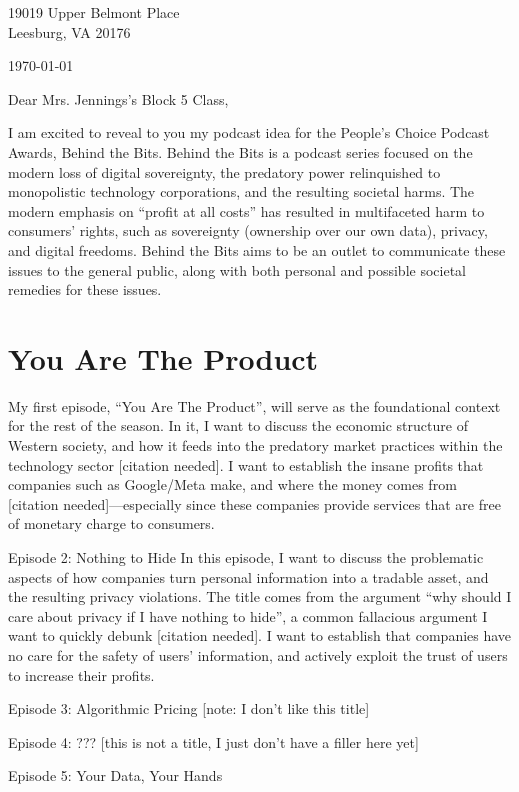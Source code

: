 \documentclass[12pt]{article}
\begin{document}
\begin{flushright}
  19019 Upper Belmont Place \\ Leesburg, VA 20176
  
  \medskip \today
\end{flushright}

\medskip
Dear Mrs. Jennings’s Block 5 Class,

\medskip
I am excited to reveal to you my podcast idea for the People’s Choice Podcast
Awards, Behind the Bits. Behind the Bits is a podcast series focused on the
modern loss of digital sovereignty, the predatory power relinquished to
monopolistic technology corporations, and the resulting societal harms. The
modern emphasis on “profit at all costs” has resulted in multifaceted harm to
consumers’ rights, such as sovereignty (ownership over our own data), privacy,
and digital freedoms. Behind the Bits aims to be an outlet to communicate these
issues to the general public, along with both personal and possible societal
remedies for these issues.

\section{You Are The Product}
My first episode, “You Are The Product”, will serve as the foundational context for the rest of the season. In it, I want to discuss the economic structure of Western society, and how it feeds into the predatory market practices within the technology sector [citation needed]. I want to establish the insane profits that companies such as Google/Meta make, and where the money comes from [citation needed]—especially since these companies provide services that are free of monetary charge to consumers.

Episode 2: Nothing to Hide
In this episode, I want to discuss the problematic aspects of how companies turn personal information into a tradable asset, and the resulting privacy violations. The title comes from the argument “why should I care about privacy if I have nothing to hide”, a common fallacious argument I want to quickly debunk [citation needed]. I want to establish that companies have no care for the safety of users’ information, and actively exploit the trust of users to increase their profits.

Episode 3: Algorithmic Pricing [note: I don’t like this title]

Episode 4: ??? [this is not a title, I just don’t have a filler here yet]

Episode 5: Your Data, Your Hands
\end{document}
